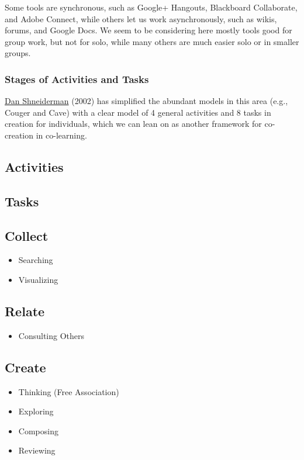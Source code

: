 Some tools are synchronous, such as Google+ Hangouts, Blackboard
Collaborate, and Adobe Connect, while others let us work asynchronously,
such as wikis, forums, and Google Docs. We seem to be considering here
mostly tools good for group work, but not for solo, while many others
are much easier solo or in smaller groups.

\subsubsection{Stages of Activities and Tasks}

\href{\#shneiderman}{Dan Shneiderman} (2002) has simplified the abundant
models in this area (e.g., Couger and Cave) with a clear model of 4
general activities and 8 tasks in creation for individuals, which we can
lean on as another framework for co-creation in co-learning.

\subsection{\textbf{Activities}}

\subsection{\textbf{Tasks}}

\subsection{Collect}

\begin{itemize}
\item
  Searching
\item
  Visualizing
\end{itemize}
\subsection{Relate}

\begin{itemize}
\item
  Consulting Others
\end{itemize}
\subsection{Create}

\begin{itemize}
\item
  Thinking (Free Association)
\item
  Exploring
\item
  Composing
\item
  Reviewing
\end{itemize}
